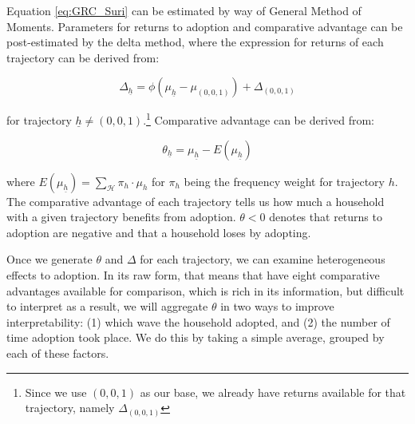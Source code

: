 \documentclass{article}
\begin{document}
Equation \ref{eq:GRC_Suri} can be estimated by way of General Method of Moments. Parameters for returns to adoption and comparative advantage can be post-estimated by the delta method, where the expression for returns of each trajectory can be derived from:

$$
\Delta_{\underline{h}}=\phi\left(\mu_{\underline{h}}-\mu_{(0,0,1)}\right) + \Delta_{(0,0,1)}
$$

for trajectory $\underline{h} \neq (0,0,1)$.\footnote{Since we use $(0,0,1)$ as our base, we already have returns available for that trajectory, namely $\Delta_{(0,0,1)}$} Comparative advantage can be derived from:

$$
\theta_{\underline{h}} = \mu_{\underline{h}} - E(\mu_{\underline{h}})
$$

where $E(\mu_{\underline{h}}) = \sum_{\mathcal{H}} \pi_h \cdot \mu_h$ for $\pi_h$ being the frequency weight for trajectory $h$. The comparative advantage of each trajectory tells us how much a household with a given trajectory benefits from adoption. $\theta <0 $ denotes that returns to adoption are negative and that a household loses by adopting.

Once we generate $\theta$ and $\Delta$ for each trajectory, we can examine heterogeneous effects to adoption. In its raw form, that means that have eight comparative advantages available for comparison, which is rich in its information, but difficult to interpret as a result, we will aggregate $\theta$ in two ways to improve interpretability: (1) which wave the household adopted, and (2) the number of time adoption took place. We do this by taking a simple average, grouped by each of these factors.
\end{document}
